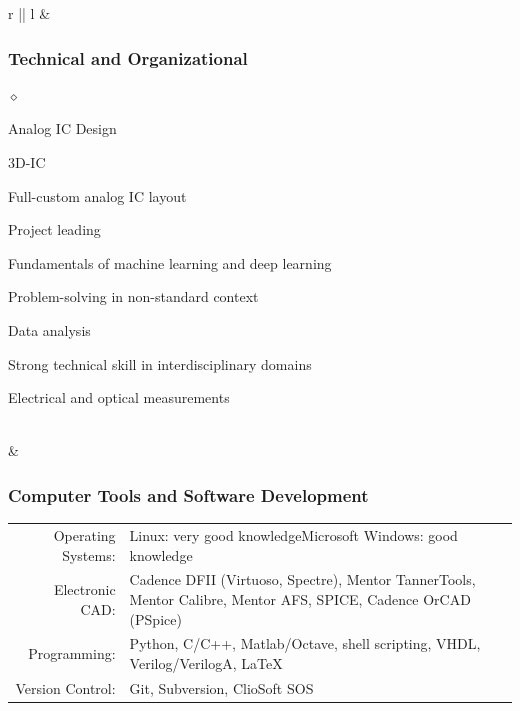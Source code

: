 \documentclass[a4paper]{article}
\newlength{\sectsep}
\newlength{\subsectsep}
\renewenvironment{itemize}{
  \begin{list}{$\diamond$}{
    \setlength{\topsep}{0.25em}
    \setlength{\itemsep}{0em}
    \setlength{\parskip}{0pt}
    \setlength{\parsep}{0em}
  }
}{
  \end{list}
}
\begin{document}
\begin{longtable}{r || l}
  & \begin{minipage}{0.9\textwidth}
      \vspace{\subsectsep}
      \subsubsection*{Technical and Organizational}
      \begin{itemize}
          \item Analog IC Design
          \item 3D-IC
          \item Full-custom analog IC layout
          \item Project leading
          \item Fundamentals of machine learning and deep learning
          \item Problem-solving in non-standard context
          \item Data analysis
          \item Strong technical skill in interdisciplinary domains
          \item Electrical and optical measurements
      \end{itemize}
  \end{minipage} \\[\sectsep]

  & \begin{minipage}{0.9\textwidth}
      \vspace{\subsectsep}
      \subsubsection*{Computer Tools and Software Development}
      \begin{tabular*}{\textwidth}{r p{}}
        Operating Systems:&{Linux: very good knowledge\newline Microsoft Windows: good knowledge}\vspace{0.5ex}\\[0.5ex]
        Electronic CAD:&Cadence DFII (Virtuoso, Spectre), Mentor TannerTools, Mentor Calibre, Mentor AFS, SPICE, Cadence OrCAD (PSpice)\vspace{0.5ex}\\[0.5ex]
        Programming:&Python, C/C++, Matlab/Octave, shell scripting, VHDL, Verilog/VerilogA, {\fontfamily{arial}\selectfont\LaTeX}\vspace{0.5ex}\\[0.5ex]
        Version Control:&Git, Subversion, ClioSoft SOS
      \end{tabular*}\\
  \end{minipage} \\[\sectsep]


\end{longtable}
\end{document}
